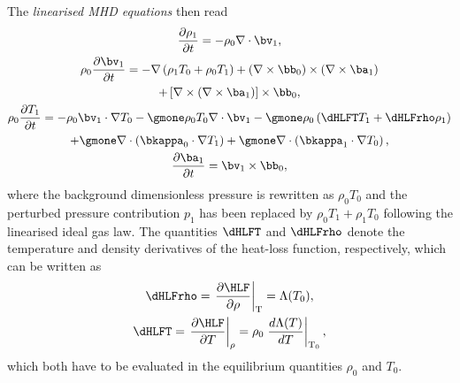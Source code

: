 The \emph{linearised MHD equations} then read
\begin{gather}
  \frac{\partial \rho_1}{\partial t} = -\rho_0 \nabla \cdot \bv_1, \\
  \rho_0 \frac{\partial \bv_1}{\partial t} =
    -\nabla\left(\rho_1 T_0 + \rho_0 T_1\right)
    +\left(\nabla \times \bb_0\right) \times \left(\nabla \times \ba_1\right) \nonumber \\
    +\left[\nabla \times \left(\nabla \times \ba_1\right)\right] \times \bb_0, \\
  \rho_0\frac{\partial T_1}{\partial t} =
    -\rho_0\bv_1 \cdot \nabla T_0
    -\gmone \rho_0 T_0 \nabla \cdot \bv_1
    -\gmone \rho_0 \left(\dHLFT T_1 + \dHLFrho \rho_1\right) \nonumber \\
    +\gmone \nabla \cdot \left(\bkappa_0 \cdot \nabla T_1\right)
    +\gmone \nabla \cdot \left(\bkappa_1 \cdot \nabla T_0\right), \\
  \frac{\partial \ba_1}{\partial t} = \bv_1 \times \bb_0,
\end{gather}
where the background dimensionless pressure is rewritten as $\rho_0 T_0$ and the perturbed pressure contribution $p_1$ has been replaced by $\rho_0 T_1 + \rho_1 T_0$ following the linearised ideal gas law. The quantities $\dHLFT$ and $\dHLFrho$ denote the temperature and density derivatives of the heat-loss function, respectively, which can be written as
\begin{equation}
  \begin{gathered}
    \dHLFrho = \left.\frac{\partial \HLF}{\partial \rho}\right|_\text{T} = \Lambda(T_0), \\
    \dHLFT = \left.\frac{\partial \HLF}{\partial T}\right|_\rho =
      \rho_0 \left.\frac{d\Lambda(T)}{dT}\right|_{\text{T}_0},
  \end{gathered}
\end{equation}
which both have to be evaluated in the equilibrium quantities $\rho_0$ and $T_0$.

